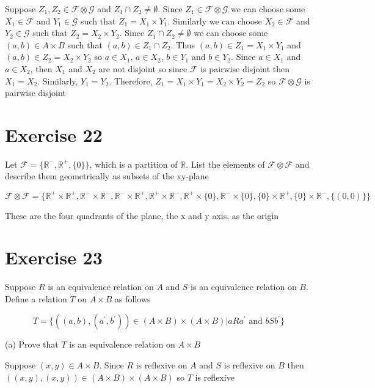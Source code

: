 \documentclass[11pt]{article}
\newcommand{\family}[1]{\mathcal{#1}}
\begin{document}
Suppose $Z_1, Z_2 \in \family{F} \otimes \family{G}$ and 
$Z_1 \cap Z_2 \neq \emptyset$. Since $Z_1 \in \family{F} \otimes \family{G}$ 
we can choose some $X_1 \in \family{F}$ and $Y_1 \in \family{G}$ such that 
$Z_1 = X_1 \times Y_1$. Similarly we can choose $X_2 \in \family{F}$ and 
$Y_2 \in \family{G}$ such that $Z_2 = X_2 \times Y_2$. Since 
$Z_1 \cap Z_2 \neq \emptyset$ we can choose some $(a, b) \in A \times B$ such that 
$(a,b) \in Z_1 \cap Z_2$. Thus $(a,b) \in Z_1 = X_1 \times Y_1$ and 
$(a,b) \in Z_2 = X_2 \times Y_2$ so $a \in X_1$, $a \in X_2$, $b \in Y_1$ and 
$b \in Y_2$. Since $a \in X_1$ and $a \in X_2$, then $X_1$ and $X_2$ are not 
disjoint so since $\family{F}$ is pairwise disjoint then $X_1 = X_2$. Similarly,
$Y_1 = Y_2$. Therefore, $Z_1 = X_1 \times Y_1 = X_2 \times Y_2 = Z_2$ so 
$\family{F} \otimes \family{G}$ is pairwise disjoint

\section*{Exercise 22}

Let $\family{F} = \{\mathbb{R}^-, \mathbb{R}^+, \{0\}\}$, which is a partition
of $\mathbb{R}$. List the elements of $\family{F} \otimes \family{F}$ and 
describe them geometrically as subsets of the xy-plane

$$\family{F} \otimes \family{F} = \{
\mathbb{R}^+ \times \mathbb{R}^+,
\mathbb{R}^- \times \mathbb{R}^-,
\mathbb{R}^- \times \mathbb{R}^+,
\mathbb{R}^+ \times \mathbb{R}^-,
\mathbb{R}^+ \times \{0\},
\mathbb{R}^- \times \{0\},
\{0\} \times \mathbb{R}^+,
\{0\} \times \mathbb{R}^-,
\{(0,0)\}
\}$$

These are the four quadrants of the plane, the x and y axis, as the origin

\section*{Exercise 23}

Suppose $R$ is an equivalence relation on $A$ and $S$ is an equivalence
relation on $B$. Define a relation $T$ on $A \times B$ as follows 

$$T = \{((a,b), (a^\prime, b^\prime)) \in (A \times B) \times (A \times B) |
aRa^\prime \text{ and } bSb^\prime\}$$

\noindent (a) Prove that $T$ is an equivalence relation on $A \times B$

Suppose $(x,y) \in A \times B$. Since $R$ is reflexive on $A$ and $S$ is reflexive
on $B$ then $((x,y),(x,y)) \in (A \times B) \times (A \times B)$ so $T$ is 
reflexive
\end{document}
